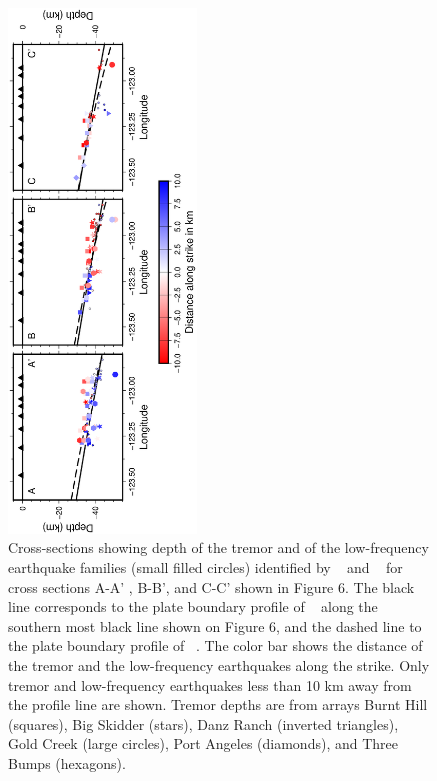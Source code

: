 \documentclass[draft]{agujournal2019}
\begin{document}
\begin{figure}
\noindent\includegraphics[width=5cm, trim={4.5cm 0.5cm 6cm 0cm},clip, angle=270]{figures/section_strike_PWS_PWS.eps}
\caption{Cross-sections showing depth of the tremor and of the low-frequency earthquake families (small filled circles) identified by ~ and ~ for cross sections A-A' , B-B', and C-C' shown in Figure 6. The black line corresponds to the plate boundary profile of ~ along the southern most black line shown on Figure 6, and the dashed line to the plate boundary profile of ~. The color bar shows the distance of the tremor and the low-frequency earthquakes along the strike. Only tremor and low-frequency earthquakes less than 10 km away from the profile line are shown. Tremor depths are from arrays Burnt Hill (squares), Big Skidder (stars), Danz Ranch (inverted triangles),  Gold Creek (large circles), Port Angeles (diamonds), and Three Bumps (hexagons).}
\label{pngfiguresample}
\end{figure}
\end{document}
